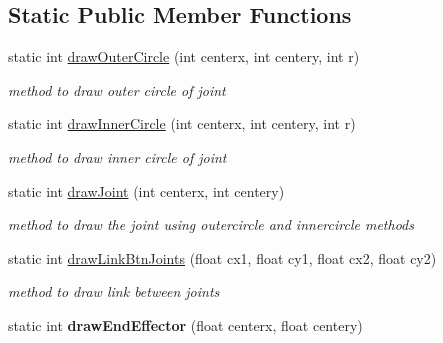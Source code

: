 \subsection*{Static Public Member Functions}
\begin{DoxyCompactItemize}
\item 
static int \hyperlink{classRobotsimulator_ab9d22fcac6da5b0c3806d015cdcd129d}{draw\+Outer\+Circle} (int centerx, int centery, int r)
\begin{DoxyCompactList}\small\item\em method to draw outer circle of joint \end{DoxyCompactList}\item 
static int \hyperlink{classRobotsimulator_a091403abfa76134b3135d98ea6fe24c4}{draw\+Inner\+Circle} (int centerx, int centery, int r)
\begin{DoxyCompactList}\small\item\em method to draw inner circle of joint \end{DoxyCompactList}\item 
static int \hyperlink{classRobotsimulator_a14ea782deab112fa6d3fc864a8aca2e8}{draw\+Joint} (int centerx, int centery)
\begin{DoxyCompactList}\small\item\em method to draw the joint using outercircle and innercircle methods \end{DoxyCompactList}\item 
static int \hyperlink{classRobotsimulator_a7b8564dcb925538dd55ec7d291d138dd}{draw\+Link\+Btn\+Joints} (float cx1, float cy1, float cx2, float cy2)
\begin{DoxyCompactList}\small\item\em method to draw link between joints \end{DoxyCompactList}\item 
static int {\bfseries draw\+End\+Effector} (float centerx, float centery)\hypertarget{classRobotsimulator_aabbda363024a68c3dc2050c20214a098}{}\label{classRobotsimulator_aabbda363024a68c3dc2050c20214a098}


\end{DoxyCompactItemize}
